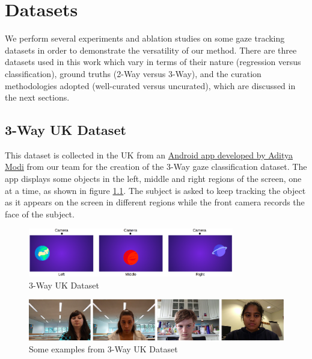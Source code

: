 \chapter{Datasets}

We perform several experiments and ablation studies on some gaze tracking datasets in order to demonstrate the versatility of our method. There are three datasets used in this work which vary in terms of their nature (regression versus classification), ground truths (2-Way versus 3-Way), and the curation methodologies adopted (well-curated versus uncurated), which are discussed in the next sections.


\section{3-Way UK Dataset}
This dataset is collected in the UK from an \href{https://drive.google.com/file/d/124HQbKAsR6YVIeK-IArFKTnjU8MRNNjh/view?usp=sharing}{Android app developed by Aditya Modi} from our team for the creation of the 3-Way gaze classification dataset. The app displays some objects in the left, middle and right regions of the screen, one at a time, as shown in figure \ref{fig:3wayUKdata}. The subject is asked to keep tracking the object as it appears on the screen in different regions while the front camera records the face of the subject.

\begin{figure}[h]
  \centering
    \includegraphics[width=0.8\textwidth]{Dataset/3-Way_UK_dataset}
    \caption{3-Way UK Dataset}
    \label{fig:3wayUKdata}
\end{figure}

\begin{figure}[h]
  \centering
    \includegraphics[width=1.0\textwidth]{Dataset/3Way_UK_subjects}
    \caption{Some examples from 3-Way UK Dataset}
    \label{fig:3wayUKdata_examples}
\end{figure}

